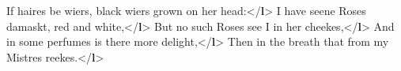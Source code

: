 \begin{shaded}
\hspace*{1em}\hspace*{1em}\hspace*{1em}If haires be wiers, black wiers grown on her head:{</\textbf{l}>}\mbox{}\newline 
\hspace*{1em}\hspace*{1em}\mbox{}\newline 
\hspace*{1em}\hspace*{1em}\mbox{}\newline 
\hspace*{1em}\hspace*{1em}\hspace*{1em}I have seene Roses damaskt, red and white,{</\textbf{l}>}\mbox{}\newline 
\hspace*{1em}\hspace*{1em}\hspace*{1em}But no such Roses see I in her cheekes,{</\textbf{l}>}\mbox{}\newline 
\hspace*{1em}\hspace*{1em}\hspace*{1em}And in some perfumes is there more delight,{</\textbf{l}>}\mbox{}\newline 
\hspace*{1em}\hspace*{1em}\hspace*{1em}Then in the breath that from my Mistres reekes.{</\textbf{l}>}\mbox{}\newline 
\hspace*{1em}\hspace*{1em}\mbox{}\newline 
\hspace*{1em}\hspace*{1em}\mbox{}\newline 

\end{shaded}
